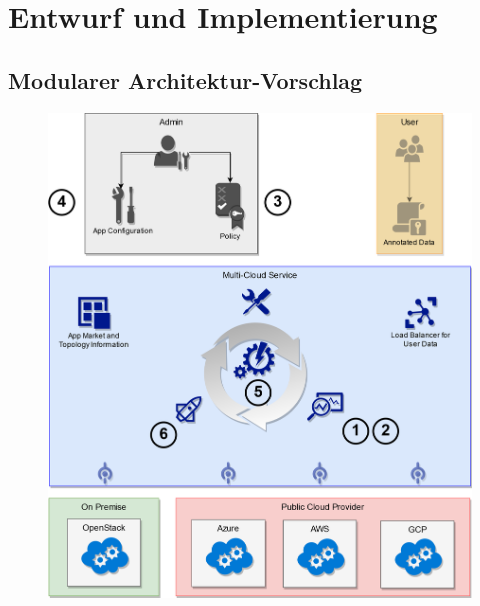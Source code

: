 \chapter{Entwurf und Implementierung}
\label{cha:implementierung}




\section{Modularer Architektur-Vorschlag}

%
%
%

\begin{figure}
	\centering
	\includegraphics[width=0.9\linewidth]{images/cycle}
	\caption{}
	\label{fig:cycle}
\end{figure}


